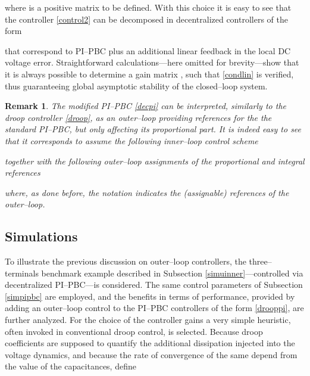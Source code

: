 \documentclass[5p,twocolumn]{elsarticle}
\def\begrem{\begin{remark}\rm}
\def\endrem{\end{remark}}
\newtheorem{remark}[theorem]{Remark}
\numberwithin{equation}{section}
\begin{document}
where  is a positive matrix to be defined. With this choice it is easy to see that the controller \eqref{control2} can be decomposed in  decentralized controllers of the form


that correspond to  PI--PBC plus an additional linear feedback in the local DC voltage error. Straightforward calculations---here omitted for brevity---show that it is always possible to determine a gain  matrix , such that \eqref{condlin} is verified, thus guaranteeing global asymptotic stability of the closed--loop system.
\begrem
The modified PI--PBC \eqref{decpi} can be interpreted, similarly to the droop controller \eqref{droop}, as an outer--loop  providing references for the the standard PI--PBC, \textit{but only} affecting its proportional part. It is indeed easy to see that it corresponds to assume the following inner--loop control scheme

together with the following outer--loop assignments of the proportional and integral references

where, as done before, the notation  indicates the (assignable) references of the outer--loop.
\endrem


\subsection{Simulations}
\label{simudroop}

To illustrate the previous discussion on outer--loop controllers, the three--terminals benchmark example described in Subsection \ref{simuinner}---controlled via decentralized PI--PBC---is considered. The same control parameters of Subsection \ref{simpipbc} are employed, and the benefits in terms of performance, provided by adding an outer--loop control to the PI--PBC controllers of the form \eqref{drooppi}, are further analyzed. For the choice of the controller gains a very simple heuristic, often invoked in conventional droop control, is selected. Because droop coefficients are supposed to quantify the  additional dissipation injected into the voltage dynamics, and because the rate of convergence of the same depend from the value of the capacitances, define
\end{document}
